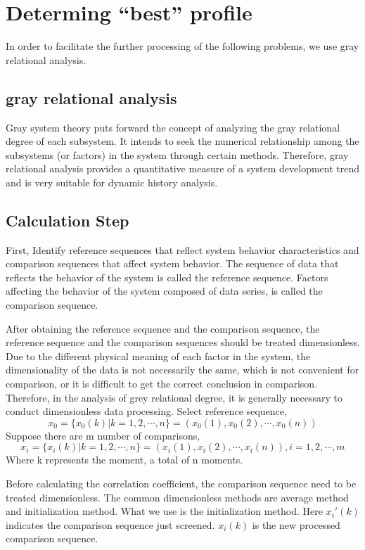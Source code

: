 \documentclass{mcmthesis}
\begin{document}
\section{Determing ``best'' profile}
In order to facilitate the further processing of the following problems, we use gray relational analysis.
\subsection{gray relational analysis}
Gray system theory puts forward the concept of analyzing the gray relational degree of each subsystem. It intends to seek the numerical relationship among the subsystems (or factors) in the system through certain methods.
Therefore, gray relational analysis provides a quantitative measure of a system development trend and is very suitable for dynamic history analysis.\cite{AZretime}

\subsection{Calculation Step}
First, Identify reference sequences that reflect system behavior characteristics and comparison sequences that affect system behavior.
The sequence of data that reflects the behavior of the system is called the reference sequence. Factors affecting the behavior of the system composed of data series, is called the comparison sequence.

After obtaining the reference sequence and the comparison sequence, the reference sequence and the comparison sequences should be treated dimensionless.
Due to the different physical meaning of each factor in the system, the dimensionality of the data is not necessarily the same, which is not convenient for comparison, or it is difficult to get the correct conclusion in comparison. Therefore, in the analysis of grey relational degree, it is generally necessary to conduct dimensionless data processing.
\newline
Select reference sequence,
\begin{equation}
  x_0 = \{x_0(k) | k=1,2,\cdots,n \} = (x_0(1), x_0(2), \cdots, x_0(n))
\end{equation}
Suppose there are m number of comparisons,
\begin{equation}
x_i = \{x_i(k) | k=1,2,\cdots,n\} = (x_i(1), x_i(2), \cdots, x_i(n)), i = 1,2,\cdots,m 
\end{equation}
Where k represents the moment, a total of n moments.

Before calculating the correlation coefficient, the comparison sequence need to be treated dimensionless. The common dimensionless methods are average method and initialization method.
What we use is the initialization method.
Here $ x_i '(k) $ indicates the comparison sequence just screened. $ x_i (k) $ is the new processed comparison sequence.
\end{document}
